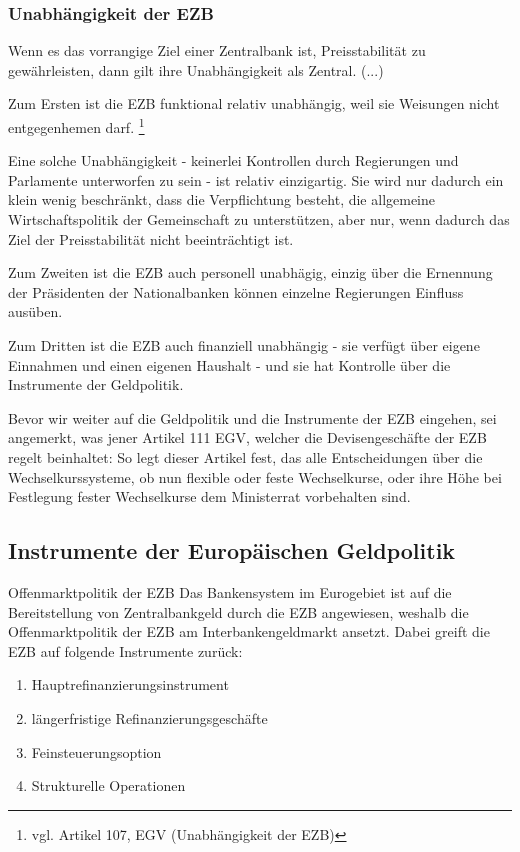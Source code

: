 \documentclass[
  onecolumn,
  a4paper,
  abstracton,
  parskip=half
  ,final
  ]{scrartcl}
\begin{document}
\subsubsection{Unabh{\"a}ngigkeit der EZB}
\citep[vgl.][S.555-557]{Basseler2010}
Wenn es das vorrangige Ziel einer Zentralbank ist, Preisstabilit{\"a}t zu gew{\"a}hrleisten, dann gilt ihre Unabh{\"a}ngigkeit als Zentral. (...)

Zum Ersten ist die EZB funktional relativ unabh{\"a}ngig, weil sie Weisungen nicht entgegenhemen darf. \footnote[34]{vgl. Artikel 107, EGV (Unabh{\"a}ngigkeit der EZB)}

Eine solche Unabh{\"a}ngigkeit - keinerlei Kontrollen durch Regierungen und Parlamente unterworfen zu sein - ist relativ einzigartig. Sie wird nur dadurch ein klein wenig beschr{\"a}nkt, dass die Verpflichtung besteht, die allgemeine Wirtschaftspolitik der Gemeinschaft zu unterst{\"u}tzen, aber nur, wenn dadurch das Ziel der Preisstabilit{\"a}t nicht beeintr{\"a}chtigt ist.

Zum Zweiten ist die EZB auch personell unabh{\"a}gig, einzig {\"u}ber die Ernennung der Pr{\"a}sidenten der Nationalbanken k{\"o}nnen einzelne Regierungen Einfluss aus{\"u}ben.

Zum Dritten ist die EZB auch finanziell unabh{\"a}ngig - sie verf{\"u}gt {\"u}ber eigene Einnahmen und einen eigenen Haushalt - und sie hat Kontrolle {\"u}ber die Instrumente der Geldpolitik.



Bevor wir weiter auf die Geldpolitik und die Instrumente der EZB eingehen, sei angemerkt, was jener Artikel 111 EGV, welcher die Devisengesch{\"a}fte der EZB regelt beinhaltet:
So legt dieser Artikel fest, das alle Entscheidungen {\"u}ber die Wechselkurssysteme, ob nun flexible oder feste Wechselkurse, oder ihre H{\"o}he bei Festlegung fester Wechselkurse dem Ministerrat vorbehalten sind. \citep[vgl.][S.555]{Basseler2010}




\subsection{Instrumente der Europ{\"a}ischen Geldpolitik}
\citep[vgl.][S.558f]{Basseler2010}

Offenmarktpolitik der EZB
Das Bankensystem im Eurogebiet ist auf die Bereitstellung von Zentralbankgeld durch die EZB angewiesen, weshalb die Offenmarktpolitik der EZB am Interbankengeldmarkt ansetzt. Dabei greift die EZB auf folgende Instrumente zur{\"u}ck:
\begin{enumerate}
 \item{Hauptrefinanzierungsinstrument}
 \item{l{\"a}ngerfristige Refinanzierungsgesch{\"a}fte}
 \item{Feinsteuerungsoption}
 \item{Strukturelle Operationen}
 \end{enumerate}
\end{document}
